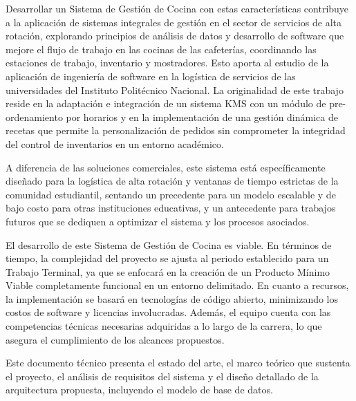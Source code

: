 Desarrollar un Sistema de Gestión de Cocina con estas características contribuye a la aplicación de sistemas integrales de gestión en el sector de servicios de alta rotación, explorando principios de análisis de datos y desarrollo de software que mejore el flujo de trabajo en las cocinas de las cafeterías, coordinando las estaciones de trabajo, inventario y mostradores. Esto aporta al estudio de la aplicación de ingeniería de software en la logística de servicios de las universidades del Instituto Politécnico Nacional. La originalidad de este trabajo reside en la adaptación e integración de un sistema KMS con un módulo de pre-ordenamiento por horarios y en la implementación de una gestión dinámica de recetas que permite la personalización de pedidos sin comprometer la integridad del control de inventarios en un entorno académico.  

A diferencia de las soluciones comerciales, este sistema está específicamente diseñado para la logística de alta rotación y ventanas de tiempo estrictas de la comunidad estudiantil, sentando un precedente para un modelo escalable y de bajo costo para otras instituciones educativas, y un antecedente para trabajos futuros que se dediquen a optimizar el sistema y los procesos asociados. 

El desarrollo de este Sistema de Gestión de Cocina es viable. En términos de tiempo, la complejidad del proyecto se ajusta al periodo establecido para un Trabajo Terminal, ya que se enfocará en la creación de un Producto Mínimo Viable completamente funcional en un entorno delimitado. En cuanto a recursos, la implementación se basará en tecnologías de código abierto, minimizando los costos de software y licencias involucradas. Además, el equipo cuenta con las competencias técnicas necesarias adquiridas a lo largo de la carrera, lo que asegura el cumplimiento de los alcances propuestos. 

Este documento técnico presenta el estado del arte, el marco teórico que sustenta el proyecto, el análisis de requisitos del sistema y el diseño detallado de la arquitectura propuesta, incluyendo el modelo de base de datos.